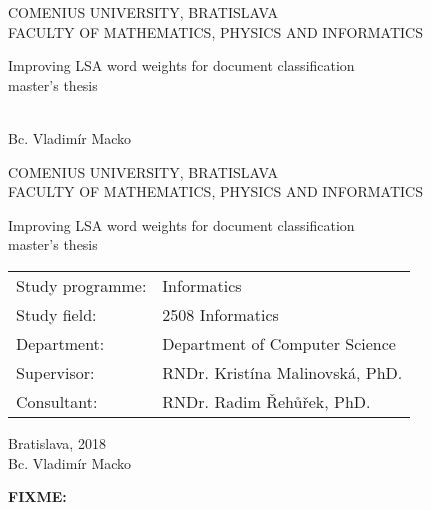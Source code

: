 \documentclass[12pt, oneside]{book}
\theoremstyle{definition}
\def\mfrok{2018}
\def\mfnazov{Improving LSA word weights for document classification}
\def\mftyp{master's thesis}
\def\mfautor{Bc. Vladimír Macko}
\def\mfskolitel{RNDr. Kristína Malinovská, PhD.}
\def\*{{\color{red} \bf FIXME: }}
\def\mfkonzultant{RNDr. Radim Řehůřek, PhD.}
\def\mfmiesto{Bratislava, \mfrok}
\def\mfodbor{ 2508 Informatics }
\def\program{ Informatics }
\def\mfpracovisko{ Department of Computer Science }
\begin{document}
     

\thispagestyle{empty}

\begin{center}
\sc\large
COMENIUS UNIVERSITY, BRATISLAVA\\
FACULTY OF MATHEMATICS, PHYSICS AND INFORMATICS

\vfill

{\LARGE\mfnazov}\\
\mftyp
\end{center}

\vfill

{\sc\large 
\noindent \mfrok\\
\mfautor
}

\eject %


\thispagestyle{empty}
\noindent

\begin{center}
\sc  
\large
COMENIUS UNIVERSITY, BRATISLAVA\\
FACULTY OF MATHEMATICS, PHYSICS AND INFORMATICS

\vfill

{\LARGE\mfnazov}\\
\mftyp
\end{center}

\vfill

\noindent
\begin{tabular}{ll}
Study programme: & \program \\
Study field: & \mfodbor \\
Department: & \mfpracovisko \\
Supervisor: & \mfskolitel \\
Consultant: & \mfkonzultant \\
\end{tabular}

\vfill


\noindent \mfmiesto\\
\mfautor

\eject %





\newpage 
\thispagestyle{empty}
\* %
%
\end{document}
